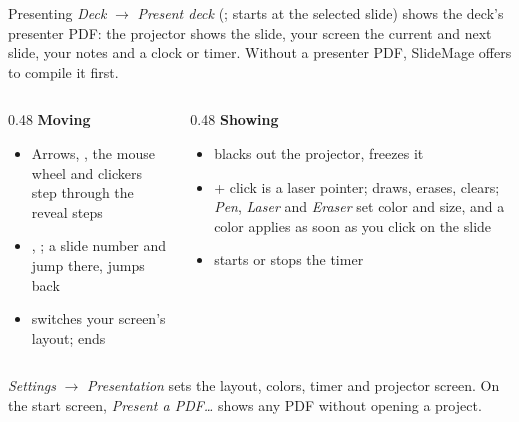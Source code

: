 
\begin{standardframe}{Presenting}
	\small
	\emph{Deck} $\rightarrow$ \emph{Present deck} (;  starts at the selected slide) shows the deck's presenter PDF: the projector shows the slide, your screen the current and next slide, your notes and a clock or timer. Without a presenter PDF, SlideMage offers to compile it first.
	\par
	\begin{columns}[T,onlytextwidth]
		\begin{column}{0.48\linewidth}
			\textbf{Moving}
			\begin{itemize}
				\item Arrows, , the mouse wheel and clickers step through the reveal steps
				\item {}, ; a slide number and  jump there,  jumps back
				\item {} switches your screen's layout;  ends
			\end{itemize}
		\end{column}
		\begin{column}{0.48\linewidth}
			\textbf{Showing}
			\begin{itemize}
				\item {} blacks out the projector,  freezes it
				\item {} + click is a laser pointer;  draws,  erases,  clears; \emph{Pen}, \emph{Laser} and \emph{Eraser} set color and size, and a color applies as soon as you click on the slide
				\item {} starts or stops the timer
			\end{itemize}
		\end{column}
	\end{columns}
	\par\medskip
	\emph{Settings} $\rightarrow$ \emph{Presentation} sets the layout, colors, timer and projector screen. On the start screen, \emph{Present a PDF\ldots} shows any PDF without opening a project.
\end{standardframe}
